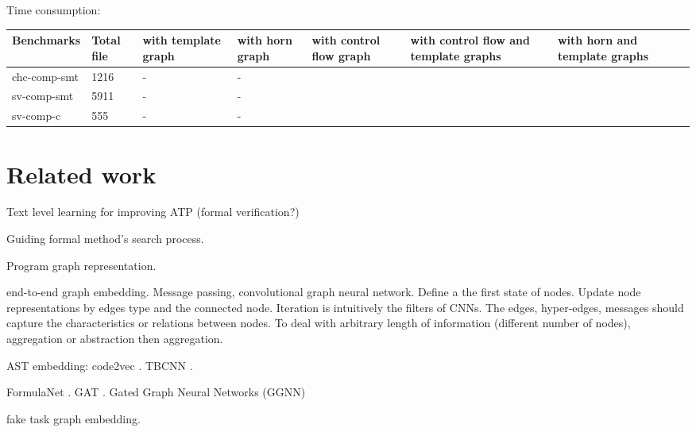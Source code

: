 \documentclass{article}
\begin{document}
Time consumption:
\begin{center}
\begin{tabular}{lp{1cm}p{1cm}p{1cm}p{1cm}p{1cm}p{1cm}p{1cm} }
\hline
Benchmarks  & Total file & with template graph & with horn graph & with control flow graph &with control flow and template graphs & with horn and template graphs\\
\hline
chc-comp-smt  & 1216 & -&-\\
sv-comp-smt  & 5911 & -&-\\
sv-comp-c  & 555 & -&-\\
\hline
\end{tabular}
\end{center}

\section{Related work}

Text level learning for improving ATP (formal verification?) \cite{NIPS2016_6280}

Guiding formal method's search process.

Program graph representation.

end-to-end graph embedding. Message passing, convolutional graph neural network.
Define a the first state of nodes. Update node representations by edges type and the connected node. Iteration is intuitively the filters of CNNs.
The edges, hyper-edges, messages should capture the characteristics or relations between nodes.
To deal with arbitrary length of information (different number of nodes), aggregation or abstraction then aggregation.

AST embedding: code2vec \cite{Alon:2019:CLD:3302515.3290353}. TBCNN \cite{DBLP:journals/corr/MouLJZW14}.


FormulaNet \cite{NIPS2017_6871}. GAT \cite{2017arXiv171010903V}.
Gated Graph Neural Networks (GGNN) \cite{DBLP:journals/corr/abs-1711-00740}

fake task graph embedding.




%
%
%
%
\end{document}
